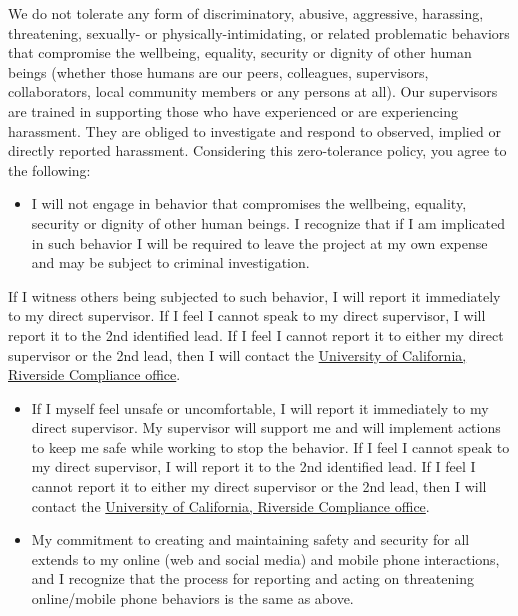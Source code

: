 \documentclass[
]{book}
\providecommand{\tightlist}{%
  \setlength{\itemsep}{0pt}\setlength{\parskip}{0pt}}
\begin{document}
We do not tolerate any form of discriminatory, abusive, aggressive, harassing, threatening, sexually- or physically-intimidating, or related problematic behaviors that compromise the wellbeing, equality, security or dignity of other human beings (whether those humans are our peers, colleagues, supervisors, collaborators, local community members or any persons at all). Our supervisors are trained in supporting those who have experienced or are experiencing harassment. They are obliged to investigate and respond to observed, implied or directly reported harassment. Considering this zero-tolerance policy, you agree to the following:

\begin{itemize}
\tightlist
\item
  I will not engage in behavior that compromises the wellbeing, equality, security or dignity of other human beings. I recognize that if I am implicated in such behavior I will be required to leave the project at my own expense and may be subject to criminal investigation.
\end{itemize}

If I witness others being subjected to such behavior, I will report it immediately to my direct supervisor. If I feel I cannot speak to my direct supervisor, I will report it to the 2nd identified lead. If I feel I cannot report it to either my direct supervisor or the 2nd lead, then I will contact the \href{https://compliance.ucr.edu/investigations-complaint-resolution}{University of California, Riverside Compliance office}.

\begin{itemize}
\item
  If I myself feel unsafe or uncomfortable, I will report it immediately to my direct supervisor. My supervisor will support me and will implement actions to keep me safe while working to stop the behavior. If I feel I cannot speak to my direct supervisor, I will report it to the 2nd identified lead. If I feel I cannot report it to either my direct supervisor or the 2nd lead, then I will contact the \href{https://compliance.ucr.edu/investigations-complaint-resolution}{University of California, Riverside Compliance office}.
\item
  My commitment to creating and maintaining safety and security for all extends to my online (web and social media) and mobile phone interactions, and I recognize that the process for reporting and acting on threatening online/mobile phone behaviors is the same as above.
\end{itemize}
\end{document}

